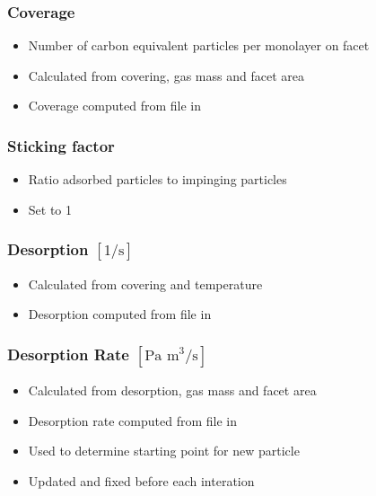 \subsubsection{Coverage}
\begin{itemize}[noitemsep,topsep=0pt]
\item Number of carbon equivalent particles per monolayer on facet
\item Calculated from covering, gas mass and facet area
\item Coverage computed from  file in 
\end{itemize}

\subsubsection{Sticking factor}
\begin{itemize}[noitemsep,topsep=0pt]
\item Ratio adsorbed particles to impinging particles
\item Set to 1
\end{itemize}

\subsubsection{Desorption $[1/\text{s}]$}
\begin{itemize}[noitemsep,topsep=0pt]
\item Calculated from covering and temperature
\item Desorption computed from  file in 
\end{itemize}

\subsubsection{Desorption Rate $[\text{Pa m}^3/\text{s}]$}
\begin{itemize}[noitemsep,topsep=0pt]
\item Calculated from desorption, gas mass and facet area
\item Desorption rate computed from  file in 
\item Used to determine starting point for new particle
\item Updated and fixed before each interation
\end{itemize}

